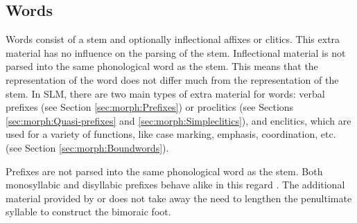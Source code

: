 \subsection{Words}\label{sec:phon:analysis:Words}
Words consist of a stem and optionally inflectional affixes or clitics. This extra material has no influence on the parsing of the stem. Inflectional material is not parsed into the same phonological word as the stem. This means that the representation of the word does not differ much from the representation of the stem. In SLM, there are two main types of extra material for words: verbal prefixes (see Section \ref{sec:morph:Prefixes}) or proclitics (see Sections \ref{sec:morph:Quasi-prefixes} and \ref{sec:morph:Simpleclitics}), and enclitics, which are used for a variety of functions, like case marking, emphasis, coordination, etc. (see Section \ref{sec:morph:Boundwords}).

Prefixes are not parsed into the same phonological word as the stem. Both monosyllabic and disyllabic prefixes behave alike in this regard . The additional material provided by  or  does not take away the need to lengthen the penultimate syllable to construct the bimoraic foot.

